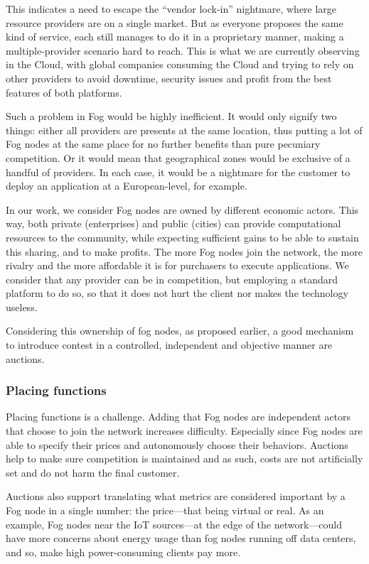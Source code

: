 \documentclass[11pt]{sdm}
\begin{document}
This indicates a need to escape the “vendor lock-in” nightmare, where large resource providers are on a single market. But as everyone proposes the same kind of service, each still manages to do it in a proprietary manner, making a multiple-provider scenario hard to reach. This is what we are currently observing in the Cloud, with global companies consuming the Cloud and trying to rely on other providers to avoid downtime, security issues and profit from the best features of both platforms. 

Such a problem in Fog would be highly inefficient. It would only signify two things: either all providers are presents at the same location, thus putting a lot of Fog nodes at the same place for no further benefits than pure pecuniary competition. Or it would mean that geographical zones would be exclusive of a handful of providers. In each case, it would be a nightmare for the customer to deploy an application at a European-level, for example.

In our work, we consider Fog nodes are owned by different economic actors. This way, both private (enterprises) and public (cities) can provide computational resources to the community, while expecting sufficient gains to be able to sustain this sharing, and to make profits. The more Fog nodes join the network, the more rivalry and the more affordable it is for purchasers to execute applications. We consider that any provider can be in competition, but employing a standard platform to do so, so that it does not hurt the client nor makes the technology useless.

Considering this ownership of fog nodes, as proposed earlier, a good mechanism to introduce contest in a controlled, independent and objective manner are auctions. 

\subsubsection{Placing functions}

Placing functions is a challenge. Adding that Fog nodes are independent actors that choose to join the network increases difficulty. Especially since Fog nodes are able to specify their prices and autonomously choose their behaviors. Auctions help to make sure competition is maintained and as such, costs are not artificially set and do not harm the final customer.

Auctions also support translating what metrics are considered important by a Fog node in a single number: the price—that being virtual or real. As an example, Fog nodes near the \gls{IoT} sources—at the edge of the network—could have more concerns about energy usage than fog nodes running off data centers, and so, make high power-consuming clients pay more.
\end{document}
